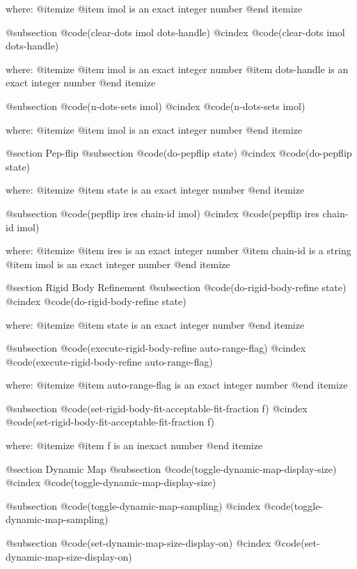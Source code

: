 where: 
 @itemize 
     @item imol is an exact integer number
 @end itemize


@subsection @code{(clear-dots imol dots-handle)}
@cindex @code{(clear-dots imol dots-handle)}
 
where: 
 @itemize 
     @item imol is an exact integer number
     @item dots-handle is an exact integer number
 @end itemize


@subsection @code{(n-dots-sets imol)}
@cindex @code{(n-dots-sets imol)}
 
where: 
 @itemize 
     @item imol is an exact integer number
 @end itemize



@section Pep-flip 
@subsection @code{(do-pepflip state)}
@cindex @code{(do-pepflip state)}
 
where: 
 @itemize 
     @item state is an exact integer number
 @end itemize


@subsection @code{(pepflip ires chain-id imol)}
@cindex @code{(pepflip ires chain-id imol)}
 
where: 
 @itemize 
     @item ires is an exact integer number
     @item chain-id is a string
     @item imol is an exact integer number
 @end itemize



@section Rigid Body Refinement 
@subsection @code{(do-rigid-body-refine state)}
@cindex @code{(do-rigid-body-refine state)}
 
where: 
 @itemize 
     @item state is an exact integer number
 @end itemize


@subsection @code{(execute-rigid-body-refine auto-range-flag)}
@cindex @code{(execute-rigid-body-refine auto-range-flag)}
 
where: 
 @itemize 
     @item auto-range-flag is an exact integer number
 @end itemize


@subsection @code{(set-rigid-body-fit-acceptable-fit-fraction f)}
@cindex @code{(set-rigid-body-fit-acceptable-fit-fraction f)}
 
where: 
 @itemize 
     @item f is an inexact number
 @end itemize



@section Dynamic Map 
@subsection @code{(toggle-dynamic-map-display-size)}
@cindex @code{(toggle-dynamic-map-display-size)}
 
@subsection @code{(toggle-dynamic-map-sampling)}
@cindex @code{(toggle-dynamic-map-sampling)}
 
@subsection @code{(set-dynamic-map-size-display-on)}
@cindex @code{(set-dynamic-map-size-display-on)}
 
